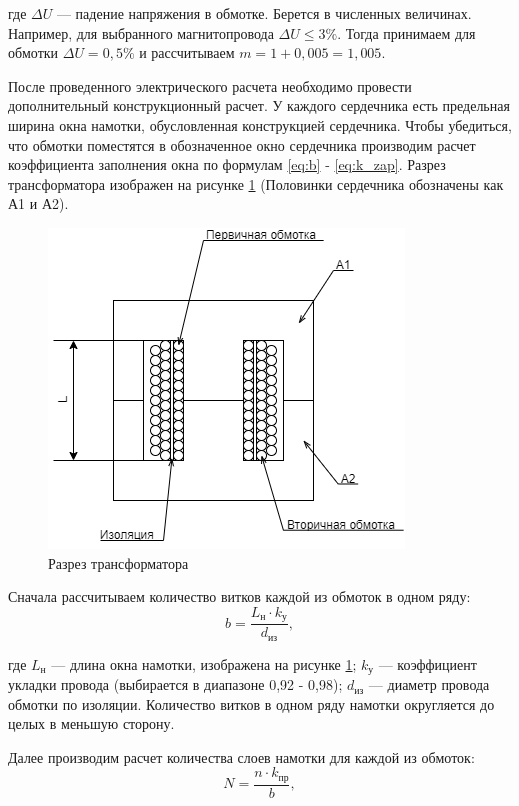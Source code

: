 \documentclass[utf8x, 14pt, oneside, a4paper]{article}
\begin{document}
		\noindent где ${\Delta}U$ --- падение напряжения в обмотке.  Берется в численных величинах. Например, для выбранного магнитопровода ${\Delta}U \leqslant 3\%$. Тогда принимаем для обмотки ${\Delta}U = 0,5\%$ и рассчитываем $m = 1 + 0,005 = 1,005$.
		
		После проведенного электрического расчета необходимо провести дополнительный конструкционный расчет. У каждого сердечника есть предельная ширина окна намотки, обусловленная конструкцией сердечника. Чтобы убедиться, что обмотки поместятся в обозначенное окно сердечника производим расчет коэффициента заполнения окна по формулам \ref{eq:b} - \ref{eq:k_zap}. Разрез трансформатора изображен на рисунке \ref{fig:transformator} (Половинки сердечника обозначены как А1 и А2).
		
		\begin{figure}[H]
			\centering
			\includegraphics[width=0.7\linewidth]{"Рисунки/Схемы/СердечникВРазрезе"}
			\caption{Разрез трансформатора}
			\label{fig:transformator}
		\end{figure}
		
		Сначала рассчитываем количество витков каждой из обмоток в одном ряду:
		\begin{equation}
			b = \frac{L_{\text{н}} \cdot k_{\text{у}}}{d_{\text{из}}},
			\label{eq:b}
		\end{equation}
	
		\noindent где $L_{\text{н}}$ --- длина окна намотки, изображена на рисунке \ref{fig:transformator}; $k_{\text{у}}$ --- коэффициент укладки провода (выбирается в диапазоне 0,92 - 0,98); $d_{\text{из}}$ --- диаметр провода обмотки по изоляции. Количество витков в одном ряду намотки округляется до целых в меньшую сторону.
			
		Далее производим расчет количества слоев намотки для каждой из обмоток:
		\begin{equation}
			N = \frac{n \cdot k_{\text{пр}}}{b},
			\label{eq:N}
		\end{equation}
	
\end{document}
